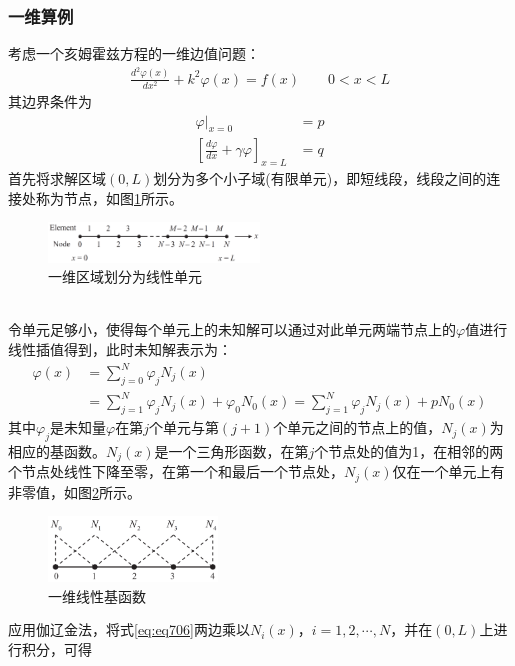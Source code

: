 \documentclass{article}
\numberwithin{equation}{section}
\begin{document}
\subsubsection{一维算例}
考虑一个亥姆霍兹方程的一维边值问题：
\begin{align}
    \label{eq:eq706}
    \frac{d^2\varphi(x)}{dx^2}+k^2\varphi(x)=f(x)\qquad 0<x<L
\end{align}
其边界条件为
\begin{align}
    \label{eq:eq707}
    \left.\varphi\right|_{x=0}&=p \\
    \label{eq:eq710}
    \left[\frac{d\varphi}{dx}+\gamma\varphi\right]_{x=L}&=q
\end{align}
首先将求解区域$(0,L)$划分为多个小子域(有限单元)，即短线段，线段之间的连接处称为节点，如图\ref{fig:fig55}所示。
\begin{figure}[ht]
    \centering
    \includegraphics[width=0.5\textwidth]{一维区域划分为线性单元.PNG}
    \caption{一维区域划分为线性单元}
    \label{fig:fig55}
\end{figure}
\\
令单元足够小，使得每个单元上的未知解可以通过对此单元两端节点上的$\varphi$值进行线性插值得到，此时未知解表示为：
\begin{align}
    \label{eq:eq708}
    \varphi(x)&=\sum_{j=0}^{N}\varphi_jN_j(x) \nonumber \\
              &=\sum_{j=1}^{N}\varphi_jN_j(x)+\varphi_0N_0(x)=\sum_{j=1}^{N}\varphi_jN_j(x)+pN_0(x)
\end{align}
其中$\varphi_j$是未知量$\varphi$在第$j$个单元与第$(j+1)$个单元之间的节点上的值，$N_j(x)$为相应的基函数。$N_j(x)$是一个三角形函数，在第$j$个节点处的值为1，在相邻的两个节点处线性下降至零，在第一个和最后一个节点处，$N_j(x)$仅在一个单元上有非零值，如图\ref{fig:fig56}所示。
\begin{figure}[ht]
    \centering
    \includegraphics[width=0.4\textwidth]{一维线性基函数.PNG}
    \caption{一维线性基函数}
    \label{fig:fig56}
\end{figure}
\par
应用伽辽金法，将式\ref{eq:eq706}两边乘以$N_i(x)$，$i=1,2,\cdots,N$，并在$(0,L)$上进行积分，可得
\end{document}
